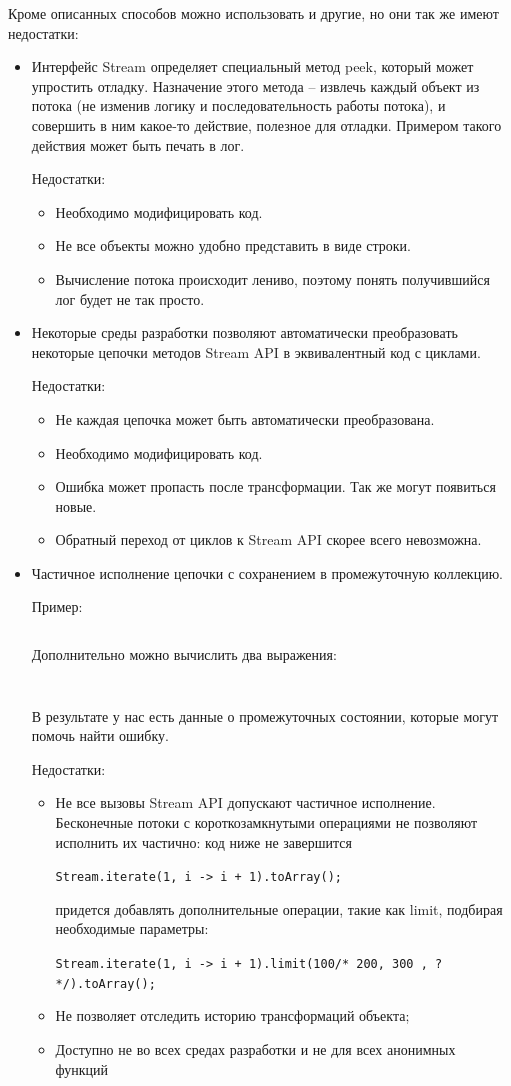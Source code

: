 Кроме описанных способов можно использовать и другие, но они так же имеют недостатки:
\begin{itemize}
	\item Интерфейс Stream определяет специальный метод peek, который может упростить отладку. Назначение этого метода -- извлечь каждый объект из потока (не изменив логику и последовательность работы потока), и совершить в ним какое-то действие, полезное для отладки. Примером такого действия может быть печать в лог. 
	
	Недостатки: 
	\begin{itemize}
		\item Необходимо модифицировать код.
		\item Не все объекты можно удобно представить в виде строки.
		\item Вычисление потока происходит лениво, поэтому понять получившийся лог будет не так просто.
	\end{itemize}

	\item Некоторые среды разработки позволяют автоматически преобразовать некоторые цепочки методов Stream API в эквивалентный код с циклами. 
	
	Недостатки:
	\begin{itemize}
		\item Не каждая цепочка может быть автоматически преобразована.
		\item Необходимо модифицировать код.
		\item Ошибка может пропасть после трансформации. Так же могут появиться новые.
		\item Обратный переход от циклов к Stream API скорее всего невозможна.
	\end{itemize}
	
	\item Частичное исполнение цепочки с сохранением в промежуточную коллекцию.
	
	Пример: 
	\inputminted{java}{chapter1/code/PartialEvaluationFull.java}
	Дополнительно можно вычислить два выражения:
	\inputminted{java}{chapter1/code/PartialEvaluation1.java}
	\inputminted{java}{chapter1/code/PartialEvaluation2.java}
	В результате у нас есть данные о промежуточных состоянии, которые могут помочь найти ошибку.
	
	Недостатки:
	\begin{itemize}
		\item Не все вызовы Stream API допускают частичное исполнение. Бесконечные потоки с короткозамкнутыми операциями не позволяют исполнить их частично: код ниже не завершится
		
		\texttt{Stream.iterate(1, i -> i + 1).toArray();}
		
		придется добавлять дополнительные операции, такие как limit, подбирая необходимые параметры:
		
		\texttt{Stream.iterate(1, i -> i + 1).limit(100/* 200, 300 , ? */).toArray();}
		\item Не позволяет отследить историю трансформаций объекта;
		\item Доступно не во всех средах разработки и не для всех анонимных функций
	\end{itemize}
\end{itemize}

